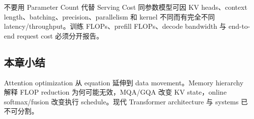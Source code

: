 \begin{warningbox}{不要用 Parameter Count 代替 Serving Cost}
同参数模型可因 KV heads、context length、batching、precision、parallelism 和 kernel 不同而有完全不同 latency/throughput。训练 FLOPs、prefill FLOPs、decode bandwidth 与 end-to-end request cost 必须分开报告。
\end{warningbox}

\subsection{本章小结}

Attention optimization 从 equation 延伸到 data movement。Memory hierarchy 解释 FLOP reduction 为何可能无效，MQA/GQA 改变 KV state，online softmax/fusion 改变执行 schedule。现代 Transformer architecture 与 systems 已不可分割。

